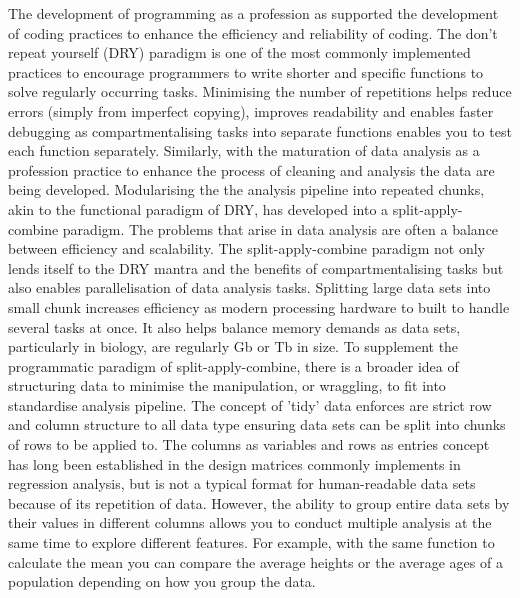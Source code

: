 \documentclass{SBCbookchapter}
\begin{document}
The development of programming as a profession as supported the development of coding practices to enhance the efficiency and reliability of coding. The don't repeat yourself (DRY) paradigm is one of the most commonly implemented practices to encourage programmers to write shorter and specific functions to solve regularly occurring tasks. Minimising the number of repetitions helps reduce errors (simply from imperfect copying), improves readability and enables faster debugging as compartmentalising tasks into separate functions enables you to test each function separately. Similarly, with the maturation of data analysis as a profession practice to enhance the process of cleaning and analysis the data are being developed. Modularising the the analysis pipeline into repeated chunks, akin to the functional paradigm of DRY, has developed into a split-apply-combine paradigm. The problems that arise in data analysis are often a balance between efficiency and scalability. The split-apply-combine paradigm not only lends itself to the DRY mantra and the benefits of compartmentalising tasks but also enables parallelisation of data analysis tasks. Splitting large data sets into small chunk increases efficiency as modern processing hardware to built to handle several tasks at once. It also helps balance memory demands as data sets, particularly in biology, are regularly Gb or Tb in size. To supplement the programmatic paradigm of split-apply-combine, there is a broader idea of structuring data to minimise the manipulation, or wraggling, to fit into standardise analysis pipeline. The concept of 'tidy' data enforces are strict row and column structure to all data type ensuring data sets can be split into chunks of rows to be applied to. The columns as variables and rows as entries concept has long been established in the design matrices commonly implements in regression analysis, but is not a typical format for human-readable data sets because of its repetition of data. However, the ability to group entire data sets by their values in different columns allows you to conduct multiple analysis at the same time to explore different features. For example, with the same function to calculate the mean you can compare the average heights or the average ages of a population depending on how you group the data. 
\end{document}
